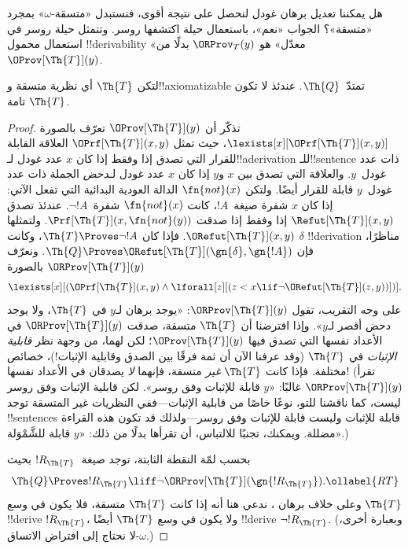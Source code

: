 \documentclass[../../../include/open-logic-section]{subfiles}
\begin{document}


هل يمكننا تعديل برهان غودل لنحصل على نتيجة أقوى، فنستبدل
«متسقة-$\omega$» بمجرد «متسقة»؟ الجواب «نعم»، باستعمال حيلة اكتشفها
روسر. وتتمثل حيلة روسر في استعمال محمول !!{derivability} «معدّل» هو
$\ORProv_T(y)$ بدلًا من~$\OProv[\Th{T}](y)$.

\begin{thm}
لتكن $\Th{T}$ أي نظرية متسقة و!!{axiomatizable} تمتدّ~$\Th{Q}$.
عندئذ لا تكون $\Th{T}$ تامة.
\end{thm}

\begin{proof}
تذكّر أن $\OProv[\Th{T}](y)$ تعرّف بالصورة
$\lexists[x][\OPrf[\Th{T}](x,y)]$، حيث تمثل
$\OPrf[\Th{T}](x,y)$ العلاقة القابلة للقرار التي تصدق إذا وفقط إذا
كان $x$ عدد غودل لـ!!a{derivation} للـ!!{sentence} ذات عدد غودل~$y$.
والعلاقة التي تصدق بين $x$ و$y$ إذا كان $x$ عدد غودل
لـ\emph{دحض} الجملة ذات عدد غودل~$y$ قابلة للقرار أيضًا. ولتكن
$\fn{not}(x)$ الدالة العودية البدائية التي تفعل الآتي: إذا كان $x$
شفرة صيغة~$!A$، كانت $\fn{not}(x)$ شفرة~$\lnot !A$. عندئذ تصدق
$\Refut[\Th{T}](x,y)$ إذا وفقط إذا صدقت
$\Prf[\Th{T}](x,\fn{not}(y))$. ولتمثلها
$\ORefut[\Th{T}](x,y)$. فإذا كان
$\Th{T}\Proves\lnot !A$، وكانت $\delta$ !!{derivation} مناظرًا، فإن
$\Th{Q}\Proves\ORefut[\Th{T}](\gn{\delta},\gn{!A})$. ونعرّف
$\ORProv[\Th{T}](y)$ بالصورة
\[
\lexists[x][(\OPrf[\Th{T}](x,y) \land \lforall[z][(z < x \lif \lnot
  \ORefut[\Th{T}](z,y))])].
\]
على وجه التقريب، تقول $\ORProv[\Th{T}](y)$: «يوجد برهان لـ$y$ في
$\Th{T}$، ولا يوجد دحض أقصر لـ$y$». وإذا افترضنا أن $\Th{T}$ متسقة،
صدقت $\ORProv[\Th{T}](y)$ في الأعداد نفسها التي تصدق فيها
$\OProv[\Th{T}](y)$؛ لكن لهما، من وجهة نظر \emph{قابلية الإثبات} في
$\Th{T}$ (وقد عرفنا الآن أن ثمة فرقًا بين الصدق وقابلية الإثبات!)،
خصائص مختلفة. فإذا كانت $\Th{T}$ \emph{غير} متسقة، فإنهما \emph{لا} يصدقان في الأعداد
نفسها!{} (تقرأ $\ORProv[\Th{T}](y)$ غالبًا: «$y$ قابلة للإثبات وفق
روسر». لكن قابلية الإثبات وفق روسر ليست، كما ناقشنا للتو، نوعًا خاصًا
من قابلية الإثبات---ففي النظريات غير المتسقة توجد !!{sentence}s قابلة
للإثبات وليست قابلة للإثبات وفق روسر---ولذلك قد تكون هذه القراءة
مضللة. ويمكنك، تجنبًا للالتباس، أن تقرأها بدلًا من ذلك: «$y$ قابلة
للشَّمْوَلة».)

بحسب لمّة النقطة الثابتة، توجد صيغة~$!R_\Th{T}$ بحيث
\begin{equation}
  \Th{Q} \Proves !R_\Th{T} \liff \lnot \ORProv[\Th{T}](\gn{!R_\Th{T}}).
  \ollabel{RT}
\end{equation}
وعلى خلاف برهان ، ندعي هنا أنه
إذا كانت $\Th{T}$ متسقة، فلا يكون في وسع $\Th{T}$ !!{derive} $!R_\Th{T}$،
ولا يكون في وسع $\Th{T}$ أيضًا !!{derive} $\lnot !R_\Th{T}$. (وبعبارة أخرى، لا نحتاج إلى
افتراض الاتساق-$\omega$.)


\end{proof}
\end{document}
